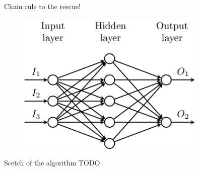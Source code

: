 \documentclass{beamer}
\begin{document}
\begin{frame}{Chain rule to the rescue!}
    \begin{figure}
        \includegraphics[width=0.8\textwidth]{../assets/mlp_model.png}
    \end{figure}
\end{frame}

\begin{frame}{Scetch of the algorithm}
    TODO
\end{frame}

\printbibliography
\end{document}
